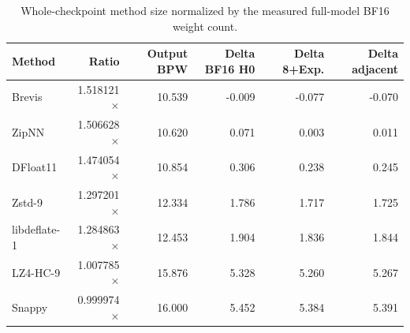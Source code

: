 \begin{table}[t]
\centering
\scriptsize
\begin{tabular}{lrrrrr}
\toprule
Method & Ratio & Output BPW & Delta BF16 H0 & Delta 8+Exp. & Delta adjacent \\
\midrule
Brevis & 1.518121$\times$ & 10.539 & -0.009 & -0.077 & -0.070 \\
ZipNN & 1.506628$\times$ & 10.620 & 0.071 & 0.003 & 0.011 \\
DFloat11 & 1.474054$\times$ & 10.854 & 0.306 & 0.238 & 0.245 \\
Zstd-9 & 1.297201$\times$ & 12.334 & 1.786 & 1.717 & 1.725 \\
libdeflate-1 & 1.284863$\times$ & 12.453 & 1.904 & 1.836 & 1.844 \\
LZ4-HC-9 & 1.007785$\times$ & 15.876 & 5.328 & 5.260 & 5.267 \\
Snappy & 0.999974$\times$ & 16.000 & 5.452 & 5.384 & 5.391 \\
\bottomrule
\end{tabular}
\caption{Whole-checkpoint method size normalized by the measured full-model BF16 weight count.}
\label{tab:brevis-method-bpw}
\end{table}
